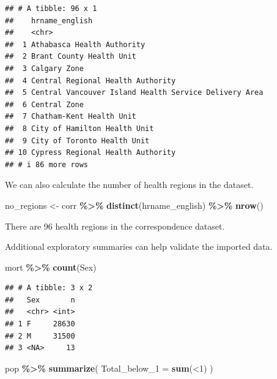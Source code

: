 \documentclass[
  11pt,
  oneside]{book}
\newenvironment{Shaded}{\begin{snugshade}}{\end{snugshade}}
\newcommand{\AttributeTok}[1]{\textcolor[rgb]{0.13,0.29,0.53}{#1}}
\newcommand{\FunctionTok}[1]{\textcolor[rgb]{0.13,0.29,0.53}{\textbf{#1}}}
\newcommand{\NormalTok}[1]{#1}
\newcommand{\OtherTok}[1]{\textcolor[rgb]{0.56,0.35,0.01}{#1}}
\newcommand{\SpecialCharTok}[1]{\textcolor[rgb]{0.81,0.36,0.00}{\textbf{#1}}}
\newcommand{\StringTok}[1]{\textcolor[rgb]{0.31,0.60,0.02}{#1}}
\begin{document}
\begin{verbatim}
## # A tibble: 96 x 1
##    hrname_english                                       
##    <chr>                                                
##  1 Athabasca Health Authority                           
##  2 Brant County Health Unit                             
##  3 Calgary Zone                                         
##  4 Central Regional Health Authority                    
##  5 Central Vancouver Island Health Service Delivery Area
##  6 Central Zone                                         
##  7 Chatham-Kent Health Unit                             
##  8 City of Hamilton Health Unit                         
##  9 City of Toronto Health Unit                          
## 10 Cypress Regional Health Authority                    
## # i 86 more rows
\end{verbatim}

We can also calculate the number of health regions in the dataset.

\begin{Shaded}
\begin{Highlighting}[]
\NormalTok{no\_regions }\OtherTok{\textless{}{-}}\NormalTok{ corr }\SpecialCharTok{\%\textgreater{}\%}
  \FunctionTok{distinct}\NormalTok{(hrname\_english) }\SpecialCharTok{\%\textgreater{}\%}
  \FunctionTok{nrow}\NormalTok{()}
\end{Highlighting}
\end{Shaded}

There are 96 health regions in the correspondence dataset.

Additional exploratory summaries can help validate the imported data.

\begin{Shaded}
\begin{Highlighting}[]
\NormalTok{mort }\SpecialCharTok{\%\textgreater{}\%}
  \FunctionTok{count}\NormalTok{(Sex)}
\end{Highlighting}
\end{Shaded}

\begin{verbatim}
## # A tibble: 3 x 2
##   Sex       n
##   <chr> <int>
## 1 F     28630
## 2 M     31500
## 3 <NA>     13
\end{verbatim}

\begin{Shaded}
\begin{Highlighting}[]
\NormalTok{pop }\SpecialCharTok{\%\textgreater{}\%}
  \FunctionTok{summarize}\NormalTok{(}
    \AttributeTok{Total\_below\_1 =} \FunctionTok{sum}\NormalTok{(}\StringTok{\textasciigrave{}}\AttributeTok{\textless{}1}\StringTok{\textasciigrave{}}\NormalTok{)}
\NormalTok{  )}
\end{Highlighting}
\end{Shaded}
\end{document}
